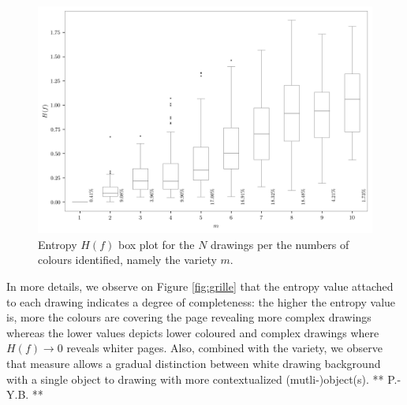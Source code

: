 \documentclass[11pt,a4paper]{article}
\begin{document}
\begin{figure}[h!]
	\centering
	\includegraphics[width=\linewidth]{figures/colors-boxplot.png}
	\caption{Entropy $H(f)$ box plot for the $N$ drawings per the numbers of colours identified, namely the variety $m$.}
	\label{fig:boxplotvariety}
\end{figure}

In more details, we observe on Figure \ref{fig:grille} that the entropy value attached to each drawing indicates a degree of completeness: the higher the entropy value is, more the colours are covering the page revealing more complex drawings whereas the lower values depicts lower coloured and complex drawings where $H(f) \rightarrow 0$ reveals whiter pages.
Also, combined with the variety, we observe that measure allows a gradual distinction between white drawing background with a single object to drawing with more contextualized (mutli-)object(s).
{\color{red} ** P.-Y.B. **}
\end{document}
